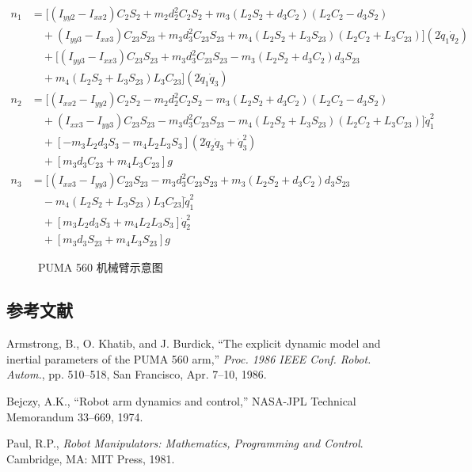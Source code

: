 \documentclass[UTF8]{ctexart}
\begin{document}
\begin{align}
n_1 &= [(I_{yy2} - I_{xx2})C_2S_2 + m_2d_2^2C_2S_2 + m_3(L_2S_2 + d_3C_2)(L_2C_2 - d_3S_2) \\
&\quad + (I_{yy3} - I_{xx3})C_{23}S_{23} + m_3d_3^2C_{23}S_{23} + m_4(L_2S_2 + L_3S_{23})(L_2C_2 + L_3C_{23})](2\dot{q}_1\dot{q}_2) \\
&\quad + [(I_{yy3} - I_{xx3})C_{23}S_{23} + m_3d_3^2C_{23}S_{23} - m_3(L_2S_2 + d_3C_2)d_3S_{23} \\
&\quad + m_4(L_2S_2 + L_3S_{23})L_3C_{23}](2\dot{q}_1\dot{q}_3) \\
n_2 &= [(I_{xx2} - I_{yy2})C_2S_2 - m_2d_2^2C_2S_2 - m_3(L_2S_2 + d_3C_2)(L_2C_2 - d_3S_2) \\
&\quad + (I_{xx3} - I_{yy3})C_{23}S_{23} - m_3d_3^2C_{23}S_{23} - m_4(L_2S_2 + L_3S_{23})(L_2C_2 + L_3C_{23})]\dot{q}_1^2 \\
&\quad + [-m_3L_2d_3S_3 - m_4L_2L_3S_3](2\dot{q}_2\dot{q}_3 + \dot{q}_3^2) \\
&\quad + [m_3d_3C_{23} + m_4L_3C_{23}]g \\
n_3 &= [(I_{xx3} - I_{yy3})C_{23}S_{23} - m_3d_3^2C_{23}S_{23} + m_3(L_2S_2 + d_3C_2)d_3S_{23} \\
&\quad - m_4(L_2S_2 + L_3S_{23})L_3C_{23}]\dot{q}_1^2 \\
&\quad + [m_3L_2d_3S_3 + m_4L_2L_3S_3]\dot{q}_2^2 \\
&\quad + [m_3d_3S_{23} + m_4L_3S_{23}]g
\end{align}

\begin{figure}[H]
\centering
{}
\caption{PUMA 560 机械臂示意图}
\end{figure}

\vspace{1em}

\subsection*{参考文献}

\noindent [Armstrong et al. 1986] Armstrong, B., O. Khatib, and J. Burdick, ``The explicit dynamic model and inertial parameters of the PUMA 560 arm,'' \textit{Proc. 1986 IEEE Conf. Robot. Autom.}, pp. 510--518, San Francisco, Apr. 7--10, 1986.

\vspace{0.5em}

\noindent [Bejczy 1974] Bejczy, A.K., ``Robot arm dynamics and control,'' NASA-JPL Technical Memorandum 33--669, 1974.

\vspace{0.5em}

\noindent [Paul 1981] Paul, R.P., \textit{Robot Manipulators: Mathematics, Programming and Control}. Cambridge, MA: MIT Press, 1981.
\end{document}
